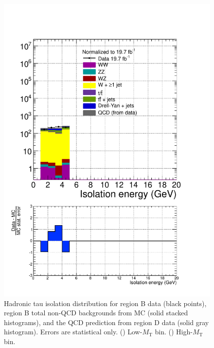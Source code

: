 \begin{figure}[hbtp]
\begin{center}
    \includegraphics[width=\cmsFigWidth]{figures/dataVsMCQCD_tauHadIso_highMT_v87}
    \caption{Hadronic tau isolation distribution for region B data (black points), region B total non-QCD backgrounds from MC (solid stacked histograms), and the QCD prediction from region D data (solid gray histogram).  Errors are statistical only. (\cmsLeft) Low-$M_{\text{T}}$ bin. (\cmsRight) High-$M_{\text{T}}$ bin.}
    \label{fig:regB-data-MC-tauHadIso}
  \end{center}
\end{figure}

